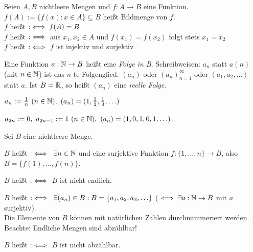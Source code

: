 \documentclass[a4paper,oneside,DIV15,BCOR12mm]{scrbook}
\begin{document}
\begin{definition}
Seien $A,B$ nichtleere Mengen und $f: A \rightarrow B$ eine Funktion. $f(A) := \{ f(x): x \in A \} \subseteq B$ heißt Bildmenge von $f$. \\
$f$ heißt  $:\iff f(A)=B$ \\
$f$ heißt  $:\iff $ aus $x_1,x_2 \in A$ und $f(x_1) = f(x_2)$ folgt stets $x_1=x_2$ \\
$f$ heißt  $:\iff$ $f$ ist injektiv und surjektiv
\end{definition}

\begin{definition}
Eine Funktion $a:\mathbb{N} \rightarrow B$ heißt eine \textit{Folge in B}. Schreibweisen: $a_n$ statt $a(n)$ (mit $n \in \mathbb{N}$) ist das $n$-te Folgenglied. $(a_n)$ oder $(a_n)_{n=1}^\infty$ oder $(a_1, a_2,\ldots)$ statt $a$. Ist $B=\mathbb{R}$, so heißt $(a_n)$ eine \textit{reelle Folge}.
\end{definition}

\begin{beispiele}
\item $a_n := \frac{1}{n} \ (n \in \mathbb{N}), \ (a_n) = (1,\frac{1}{2},\frac{1}{3},\ldots)$ \\
\item $a_{2n} := 0,\  a_{2n-1} := 1 \ (n \in \mathbb{N}), \ (a_n) = (1,0,1,0,1,\ldots)$.
\end{beispiele}

\begin{definition}
Sei $B$ eine nichtleere Menge.
\begin{liste}
\item $B$ heißt  $:\iff \ \exists n \in \mathbb{N}$ und eine surjektive Funktion $f:\{1,\ldots,n\} \rightarrow B$, also $B=\{f(1),\ldots,f(n)\}$.
\item $B$ heißt  $:\iff$ $B$ ist nicht endlich.
\item $B$ heißt  $:\iff \ \exists  (a_n) \in B: B=\{a_1,a_2,a_3,\ldots\}$ ($\iff \exists a: \mathbb{N} \rightarrow B$  mit $a$ surjektiv).\\
\glqq Die Elemente von $B$ können mit natürlichen Zahlen durchnummeriert werden.\grqq\\
Beachte: Endliche Mengen sind abzählbar!
\item $B$ heißt  $:\iff$ $B$ ist nicht abzählbar.
\end{liste}
\end{definition}
\end{document}
